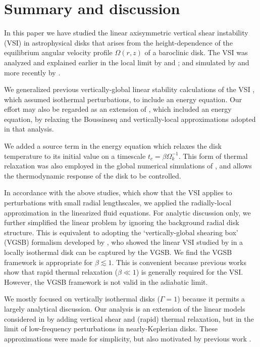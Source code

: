 \section{Summary and discussion}\label{summary}
In this paper we have studied the linear axisymmetric vertical shear
instability (VSI) in astrophysical disks that arises from the
height-dependence of the equilibrium angular velocity profile
$\Omega(r,z)$ of a baroclinic disk. The VSI was analyzed and
explained earlier in the local limit by \cite{urpin98} and
\cite{urpin03}; and simulated by \cite{arlt04} and more recently by
\cite{nelson13}.     

We generalized previous vertically-global linear stability calculations
of the VSI \citep{nelson13,mcnally14}, which assumed isothermal
perturbations, to include an energy equation. Our effort may also be
regarded as an extension of \cite{urpin03}, which included an energy
equation, by relaxing the Boussinesq and vertically-local
approximations adopted in that analysis.    

We added a source term in the energy equation which relaxes the disk
temperature to its initial value on a timescale $t_c=\beta\Omega_k^{-1}$. This
form of thermal relaxation was also employed in the global numerical
simulations of \cite{nelson13}, and allows the thermodynamic response
of the disk to be controlled.  

In accordance with the above studies, which show that the VSI applies
to perturbations with small radial lengthscales, we applied the 
radially-local approximation in the linearized fluid equations. For
analytic discussion only, we further simplified the linear problem by
ignoring the background radial disk structure. This is equivalent to adopting
the `vertically-global shearing box' (VGSB) formalism developed by
\cite{mcnally14}, who showed the linear VSI studied by
\cite{nelson13} in a locally isothermal disk can be captured by the
VGSB. We find the VGSB framework is appropriate for $\beta\lesssim1$. 
This is convenient because previous works show that rapid thermal
relaxation ($\beta\ll1$) is generally required for the VSI. However,
the VGSB framework is not valid in the adiabatic limit. 
   

We mostly focused on vertically isothermal disks ($\Gamma=1$) because
it permits a largely analytical discussion. Our analysis is an
extension of the linear models considered in \cite{lubow93} by
adding vertical shear and (rapid) thermal relaxation, but in the limit of low-frequency
perturbations in nearly-Keplerian disks. These approximations were
made for simplicity, but also motivated by previous work
\citep{nelson13}.   

